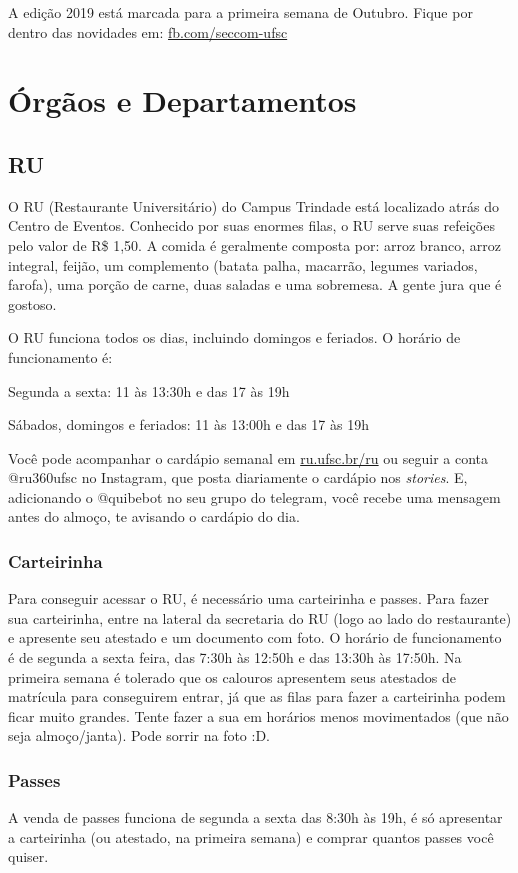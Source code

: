 \documentclass{article}
\begin{document}
A edição 2019 está marcada para a primeira semana de Outubro. Fique por dentro das novidades em: \url{fb.com/seccom-ufsc}


\section {Órgãos e Departamentos}

\subsection{RU}
O RU (Restaurante Universitário) do Campus Trindade está localizado atrás do Centro de Eventos. Conhecido por suas enormes filas, o RU serve suas refeições pelo valor de R\$ 1,50. A comida é geralmente composta por: arroz branco, arroz integral, feijão, um complemento (batata palha, macarrão, legumes variados, farofa), uma porção de carne, duas saladas e uma sobremesa. A gente jura que é gostoso. 

O RU funciona todos os dias, incluindo domingos e feriados. O horário de funcionamento é:


Segunda a sexta: 11 às 13:30h e das 17 às 19h

Sábados, domingos e feriados: 11 às 13:00h e das 17 às 19h



Você pode acompanhar o cardápio semanal em \url{ru.ufsc.br/ru} ou seguir a conta @ru360ufsc no Instagram, que posta diariamente o cardápio nos \textit{stories}. E, adicionando o @quibebot no seu grupo do telegram, você recebe uma mensagem antes do almoço, te avisando o cardápio do dia.

\subsubsection{Carteirinha} Para conseguir acessar o RU, é necessário uma carteirinha e passes. Para fazer sua carteirinha, entre na lateral da secretaria do RU (logo ao lado do restaurante) e apresente seu atestado e um documento com foto. O horário de funcionamento é de segunda a sexta feira, das 7:30h às 12:50h e das 13:30h às 17:50h. Na primeira semana é tolerado que os calouros apresentem seus atestados de matrícula para conseguirem entrar, já que as filas para fazer a carteirinha podem ficar muito grandes. Tente fazer a sua em horários menos movimentados (que não seja almoço/janta). Pode sorrir na foto :D. 
\subsubsection{Passes} 
A venda de passes funciona de segunda a sexta das 8:30h às 19h, é só apresentar a carteirinha (ou atestado, na primeira semana) e comprar quantos passes você quiser.
\end{document}
